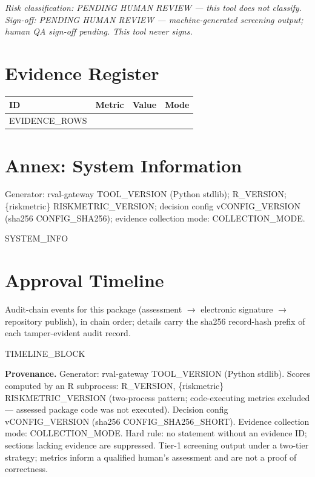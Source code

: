 \documentclass[10pt]{article}
\begin{document}
\emph{Risk classification: PENDING HUMAN REVIEW --- this tool does not classify.}\\
\emph{Sign-off: PENDING HUMAN REVIEW --- machine-generated screening output;
human QA sign-off pending. This tool never signs.}

\section*{Evidence Register}
{\footnotesize
\begin{longtable}{@{}p{1.6cm}p{4.6cm}p{5.2cm}p{4.2cm}@{}}
\toprule
\textbf{ID} & \textbf{Metric} & \textbf{Value} & \textbf{Mode} \\
\midrule
\endhead
{{EVIDENCE_ROWS}}
\bottomrule
\end{longtable}
}

\section*{Annex: System Information}
{\footnotesize
Generator: rval-gateway {{TOOL_VERSION}} (Python stdlib);
{{R_VERSION}}; \{riskmetric\} {{RISKMETRIC_VERSION}};
decision config v{{CONFIG_VERSION}} (sha256 {{CONFIG_SHA256}});
evidence collection mode: {{COLLECTION_MODE}}.

{{SYSTEM_INFO}}
}

\section*{Approval Timeline}
Audit-chain events for this package (assessment $\rightarrow$ electronic
signature $\rightarrow$ repository publish), in chain order; details carry
the sha256 record-hash prefix of each tamper-evident audit record.

{{TIMELINE_BLOCK}}

\vspace{8pt}
{\footnotesize
\textbf{Provenance.} Generator: rval-gateway {{TOOL_VERSION}} (Python stdlib).
Scores computed by an R subprocess: {{R_VERSION}}, \{riskmetric\} {{RISKMETRIC_VERSION}}
(two-process pattern; code-executing metrics excluded --- assessed package code
was not executed). Decision config v{{CONFIG_VERSION}} (sha256 {{CONFIG_SHA256_SHORT}}).
Evidence collection mode: {{COLLECTION_MODE}}. Hard rule: no statement without an
evidence ID; sections lacking evidence are suppressed. Tier-1 screening output
under a two-tier strategy; metrics inform a qualified human's assessment and are
not a proof of correctness.
}
\end{document}
